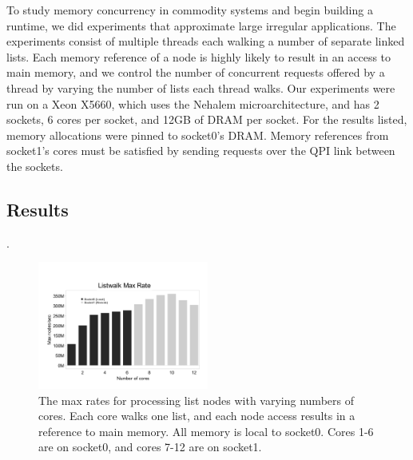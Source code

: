 

To study memory concurrency in commodity systems and begin building a runtime, we did experiments that approximate large irregular applications. The experiments consist of multiple threads each walking a number of separate linked lists. Each memory reference of a node is highly likely to result in an access to main memory, and we control the number of concurrent requests offered by a thread by varying the number of lists each thread walks.  Our experiments were run on a Xeon X5660, which uses the Nehalem microarchitecture, and has 2 sockets, 6 cores per socket, and 12GB of DRAM per socket. For the results listed, memory allocations were pinned to socket0's DRAM. Memory references from socket1's cores must be satisfied by sending requests over the QPI link between the sockets. 
\subsection{Results}
 
.
\begin{figure}[h]
	\begin{center}
		\includegraphics[width=0.5\textwidth]{figures/multi-listwalk-maxrates-edited.pdf}
	\end{center}
	\caption{The max rates for processing list nodes with varying numbers of cores. Each core walks one list, and each node access results in a reference to main memory. All memory is local to socket0. Cores 1-6 are on socket0, and cores 7-12 are on socket1.}
	\label{fig:listwalk-maxrates}
\end{figure}

